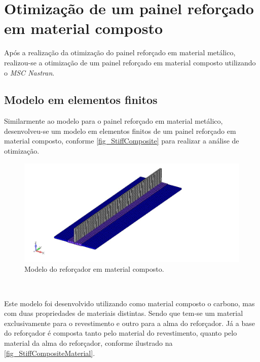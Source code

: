 {\section{Otimização de um painel reforçado em material composto}
Após a realização da otimização do painel reforçado em material metálico, realizou-se a otimização de um painel reforçado em material composto utilizando o \emph{MSC Nastran}.

\subsection{Modelo em elementos finitos}
Similarmente ao modelo para o painel reforçado em material metálico, desenvolveu-se um modelo em elementos finitos de um painel reforçado em material composto, conforme \autoref{fig_StiffComposite} para realizar a análise de otimização.

\begin{figure}[ht]
 \caption{\label{fig_StiffComposite}Modelo do reforçador em material composto.}
 \centering
 \includegraphics[scale=0.7]{figura/StiffComposite}
\end{figure}
\

Este modelo foi desenvolvido utilizando como material composto o carbono, mas com duas propriedades de materiais distintas. Sendo que tem-se um material exclusivamente para o revestimento e outro para a alma do reforçador. Já a base do reforçador é composta tanto pelo material do revestimento, quanto pelo material da alma do reforçador, conforme ilustrado na \autoref{fig_StiffCompositeMaterial}.

}
